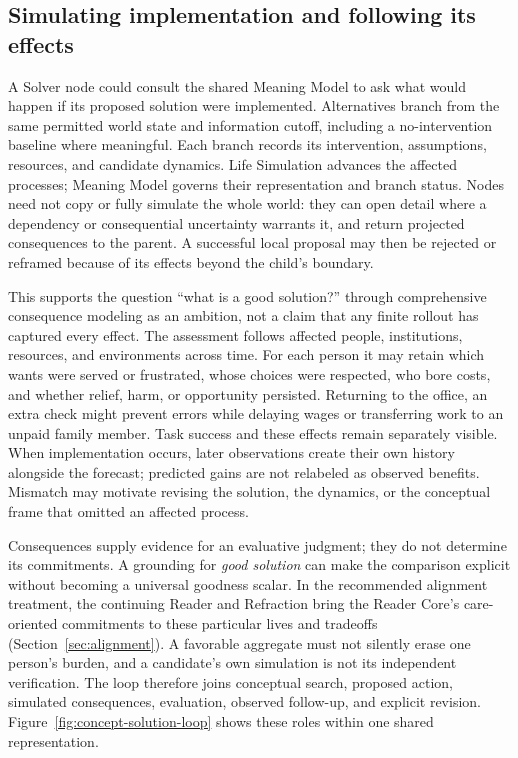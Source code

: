 \documentclass[10pt]{article}
\begin{document}
\subsection{Simulating implementation and following its effects}
\label{sec:implementation-effects}
A Solver node could consult the shared Meaning Model to ask what would happen
if its proposed solution were implemented. Alternatives branch from the same
permitted world state and information cutoff, including a no-intervention
baseline where meaningful. Each branch records its intervention, assumptions,
resources, and candidate dynamics. Life Simulation advances the affected
processes; Meaning Model governs their representation and branch status.
Nodes need not copy or fully simulate the whole world: they can open detail
where a dependency or consequential uncertainty warrants it, and return
projected consequences to the parent. A successful local proposal may then be
rejected or reframed because of its effects beyond the child's boundary.

This supports the question ``what is a good solution?'' through comprehensive
consequence modeling as an ambition, not a claim that any finite rollout has
captured every effect. The assessment follows affected people, institutions,
resources, and environments across time. For each person it may retain which
wants were served or frustrated, whose choices were respected, who bore costs,
and whether relief, harm, or opportunity persisted. Returning to the office,
an extra check might prevent errors while delaying wages or transferring work
to an unpaid family member. Task success and these effects remain separately
visible. When implementation occurs, later observations create their own
history alongside the forecast; predicted gains are not relabeled as observed
benefits. Mismatch may motivate revising the solution, the dynamics, or the
conceptual frame that omitted an affected process.

Consequences supply evidence for an evaluative judgment; they do not determine
its commitments. A grounding for \emph{good solution} can make the comparison
explicit without becoming a universal goodness scalar. In the recommended
alignment treatment, the continuing Reader and Refraction bring the Reader
Core's care-oriented commitments to these particular lives and tradeoffs
(Section~\ref{sec:alignment}). A favorable aggregate must not silently erase
one person's burden, and a candidate's own simulation is not its independent
verification. The loop therefore joins conceptual search, proposed action,
simulated consequences, evaluation, observed follow-up, and explicit revision.
Figure~\ref{fig:concept-solution-loop} shows these roles within one shared
representation.
\end{document}
